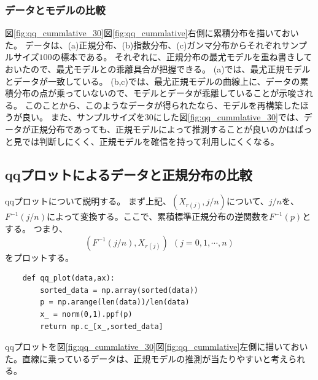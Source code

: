 \subsubsection{データとモデルの比較}
図\ref{fig:qq_cummlative_30}図\ref{fig:qq_cummlative}右側に累積分布を描いておいた。
データは、(a)正規分布、(b)指数分布、(c)ガンマ分布からそれぞれサンプルサイズ$100$の標本である。
それぞれに、正規分布の最尤モデルを重ね書きしておいたので、最尤モデルとの乖離具合が把握できる。
(a)では、最尤正規モデルとデータが一致している。
(b,c)では、最尤正規モデルの曲線上に、データの累積分布の点が乗っていないので、モデルとデータが乖離していることが示唆される。
このことから、このようなデータが得られたなら、モデルを再構築したほうが良い。
また、サンプルサイズを30にした図\ref{fig:qq_cummlative_30}では、データが正規分布であっても、正規モデルによって推測することが良いのかはぱっと見では判断しにくく、正規モデルを確信を持って利用しにくくなる。

\subsection{qqプロットによるデータと正規分布の比較}
qqプロットについて説明する。
まず上記、$(X_{r(j)},j/n)$について、$j/n$を、$F^{-1}(j/n)$によって変換する。ここで、累積標準正規分布の逆関数を$F^{-1}(p)$とする。
つまり、
\begin{equation*}
(F^{-1}(j/n),X_{r(j)}) \ \ (j=0,1,\cdots,n)
\end{equation*}
をプロットする。



\begin{lstlisting}
    def qq_plot(data,ax):
        sorted_data = np.array(sorted(data))
        p = np.arange(len(data))/len(data)
        x_ = norm(0,1).ppf(p)
        return np.c_[x_,sorted_data]
\end{lstlisting}


qqプロットを図\ref{fig:qq_cummlative_30}図\ref{fig:qq_cummlative}左側に描いておいた。直線に乗っているデータは、正規モデルの推測が当たりやすいと考えられる。

